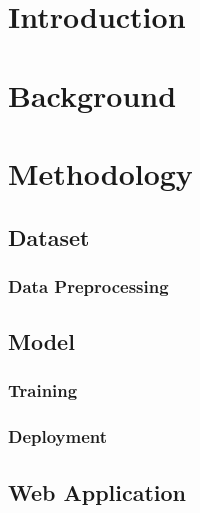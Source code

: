\documentclass[a4paper, oneside, 11pt]{article}
\begin{document}
\begin{multicols*}{2}

  \begin{abstract}
    \textit{
      \lipsum[1]
    }
  \end{abstract}


  \section{Introduction}




  \section{Background}
  \lipsum[1]

  
  \section{Methodology}
  \subsection{Dataset}
  \lipsum[1]

  \subsubsection{Data Preprocessing}
  \lipsum[1]

  \subsection{Model}
  \lipsum[1]

  \subsubsection{Training}
  \lipsum[1]

  \subsubsection{Deployment}
  \lipsum[1]

  \subsection{Web Application}

\end{multicols*}
\end{document}
